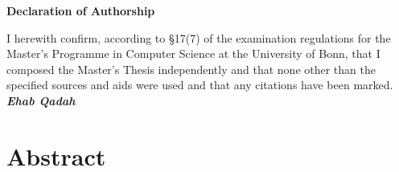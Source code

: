 \documentclass[12pt, %
a4paper, %
twoside, %
openright, %
abstract=on, %
DIV=11,      %
BCOR=8mm,openright]{scrbook}
\begin{document}
	\frontmatter
	
	

	\vspace{4cm}
	
	
	\thispagestyle{empty}
	{\noindent%
		\huge{\textbf{\textsf{Declaration of Authorship}}}
	}
	\vspace{2cm}
	\begin{flushleft}
		\noindent%
				
	I herewith confirm, according to §17(7) of the examination regulations for the Master's Programme in Computer Science at the University of Bonn, that I composed the Master's Thesis independently and that none other than the specified sources and aids were used and that any
		citations have been marked.\\
		\vspace{1cm}
		\textbf{\textit{Ehab Qadah}}
	\end{flushleft}
	
	

	\chapter*{Abstract}
	\thispagestyle{empty}
    
    
    
	\newpage 
	   
	\listoffigures
	
	\mainmatter
	
		
	
	
	
	
	
	
	
	\FloatBarrier
	
	
	 
\end{document}
